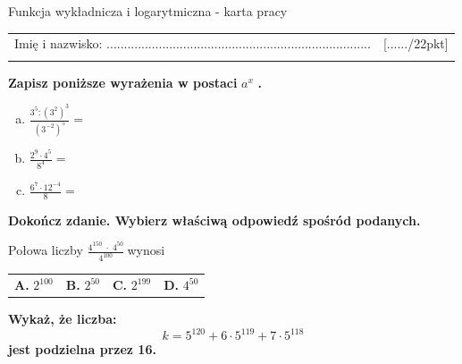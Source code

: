 \documentclass[12pt,a4paper]{article}
\theoremstyle{break}
\begin{document}
	
	\begin{center}
		\LARGE Funkcja wykładnicza i logarytmiczna - karta pracy
	\end{center}
	
	\begin{tabular}{p{13cm} r}
		Imię i nazwisko: ............................................................................
		&[....../22pkt]\\ 
		\vspace{0.5cm}
	\end{tabular}

	\begin{zad}[0-3]
		\textbf{Zapisz poniższe wyrażenia w postaci} $a^x$ \textbf{.}
	\end{zad} 
	
	\begin{enumerate}[a)]\Large
		\item $\frac{3^5:(3^2)^3}{(3^{-2})^5}=$
		\item $\frac{2^9\cdot4^5}{8^4}=$
		\item $\frac{6^7\cdot12^{-4}}{8}=$
	\end{enumerate}
	
	
	\begin{zad}[0-1]
		\textbf{Dokończ zdanie. Wybierz właściwą odpowiedź spośród podanych.}
	\end{zad} 
	
	Połowa liczby \Large$\frac{4^{150}\;\cdot\;4^{50}}{4^{100}}\:$\normalsize wynosi
	
	\vspace{0.5cm}
	\begin{tabular}{p{3.5cm} p{3.5cm} p{3.5cm} p{3.5cm}}
		\textbf{A. }$2^{100}$&
		\textbf{B. }$2^{50}$&
		\textbf{C. }$2^{199}$&
		\textbf{D. }$4^{50}$\\
	\end{tabular}

	
	\begin{zad}[0-3]
		\textbf{Wykaż, że liczba:}
		$$k=5^{120}+6\cdot5^{119}+7\cdot5^{118}$$
		\textbf{jest podzielna przez 16.}
	\end{zad} 
\end{document}
